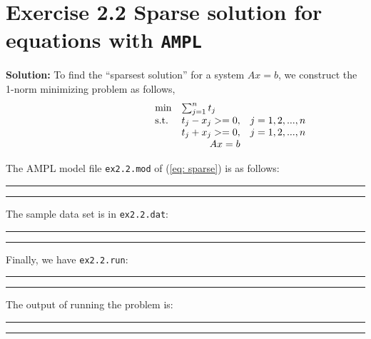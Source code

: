 \section{Exercise 2.2 Sparse solution for equations with {\tt AMPL}}
\textbf{Solution:}
To find the ``sparsest solution'' for a system $Ax=b$, we construct the 1-norm minimizing problem as follows,
\begin{equation}
\label{eq: sparse}
  \begin{array}{lrcll}
    \min
    & \multicolumn{4}{l}{\sum_{j=1}^{n} t_j} \\
    \text{s.t.}
    & t_j-x_j >=0,& j=1,2,...,n\\
    & t_j+x_j >=0,& j=1,2,...,n\\
    & Ax=b &
  \end{array}
\end{equation}

The AMPL model file {\tt ex2.2.mod} of (\ref{eq: sparse}) is as follows:

\bigskip
\hrule
\small

\normalsize
\hrule
\bigskip

The sample data set is in {\tt ex2.2.dat}:

\bigskip
\hrule
\small

\normalsize
\hrule
\bigskip

Finally, we have {\tt ex2.2.run}:

\bigskip
\hrule
\small

\normalsize
\hrule
\bigskip

The output of running the problem is:

\bigskip
\hrule
\small

\normalsize
\hrule
\bigskip

